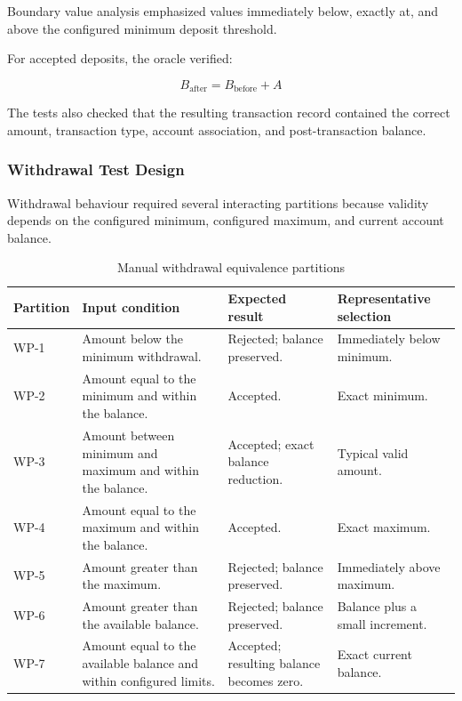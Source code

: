 \documentclass[12pt]{article}
\begin{document}
Boundary value analysis emphasized values immediately below, exactly at, and
above the configured minimum deposit threshold.

For accepted deposits, the oracle verified:

\[
B_{\text{after}} = B_{\text{before}} + A
\]

The tests also checked that the resulting transaction record contained the
correct amount, transaction type, account association, and post-transaction
balance.

\subsubsection{Withdrawal Test Design}

Withdrawal behaviour required several interacting partitions because validity
depends on the configured minimum, configured maximum, and current account
balance.

\begin{table}[H]
\centering
\caption{Manual withdrawal equivalence partitions}
\label{tab:manual-withdrawal-partitions}
\footnotesize
\begin{tabular}{|p{1.6cm}|p{4.1cm}|p{4.5cm}|p{3.4cm}|}
\hline
\textbf{Partition} &
\textbf{Input condition} &
\textbf{Expected result} &
\textbf{Representative selection} \\
\hline

WP-1 &
Amount below the minimum withdrawal. &
Rejected; balance preserved. &
Immediately below minimum. \\
\hline

WP-2 &
Amount equal to the minimum and within the balance. &
Accepted. &
Exact minimum. \\
\hline

WP-3 &
Amount between minimum and maximum and within the balance. &
Accepted; exact balance reduction. &
Typical valid amount. \\
\hline

WP-4 &
Amount equal to the maximum and within the balance. &
Accepted. &
Exact maximum. \\
\hline

WP-5 &
Amount greater than the maximum. &
Rejected; balance preserved. &
Immediately above maximum. \\
\hline

WP-6 &
Amount greater than the available balance. &
Rejected; balance preserved. &
Balance plus a small increment. \\
\hline

WP-7 &
Amount equal to the available balance and within configured limits. &
Accepted; resulting balance becomes zero. &
Exact current balance. \\
\hline

\end{tabular}
\end{table}
\end{document}
